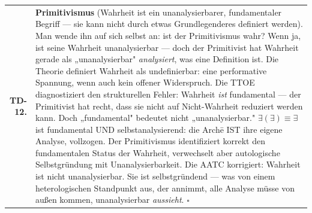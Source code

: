 \documentclass[10pt, openany, oneside]{book}
\begin{document}
{\begin{tabular}{r p{}}
\textbf{TD-12.} & \textbf{Primitivismus} (Wahrheit ist ein unanalysierbarer, fundamentaler Begriff --- sie kann nicht durch etwas Grundlegenderes definiert werden). Man wende ihn auf sich selbst an: ist der Primitivismus wahr? Wenn ja, ist seine Wahrheit unanalysierbar --- doch der Primitivist hat Wahrheit gerade als „unanalysierbar" \textit{analysiert}, was eine Definition ist. Die Theorie definiert Wahrheit als undefinierbar: eine performative Spannung, wenn auch kein offener Widerspruch. Die TTOE diagnostiziert den strukturellen Fehler: Wahrheit \textit{ist} fundamental --- der Primitivist hat recht, dass sie nicht auf Nicht-Wahrheit reduziert werden kann. Doch „fundamental" bedeutet nicht „unanalysierbar." $\exists(\exists) \equiv \exists$ ist fundamental UND selbstanalysierend: die Arch\={e} IST ihre eigene Analyse, vollzogen. Der Primitivismus identifiziert korrekt den fundamentalen Status der Wahrheit, verwechselt aber autologische Selbstgründung mit Unanalysierbarkeit. Die AATC korrigiert: Wahrheit ist nicht unanalysierbar. Sie ist selbstgründend --- was von einem heterologischen Standpunkt aus, der annimmt, alle Analyse müsse von außen kommen, unanalysierbar \textit{aussieht}. $\square$ \\[0.3em]
\end{tabular}
}

\vspace{0.5em}
\end{document}
